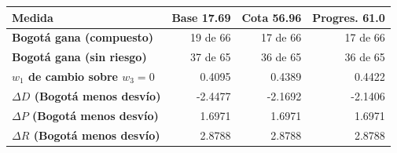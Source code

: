 \renewcommand{\arraystretch}{1.2}
\begin{tabular}{|l|r|r|r|}
\hline
\rowcolor{gray!20} \textbf{Medida} & \textbf{Base 17.69} & \textbf{Cota 56.96} & \textbf{Progres. 61.0} \\
\hline
\textbf{Bogotá gana (compuesto)} & 19 de 66 & 17 de 66 & 17 de 66 \\
\hline
\textbf{Bogotá gana (sin riesgo)} & 37 de 65 & 36 de 65 & 36 de 65 \\
\hline
\textbf{$w_1$ de cambio sobre $w_3=0$} & 0.4095 & 0.4389 & 0.4422 \\
\hline
\textbf{$\Delta D$ (Bogotá menos desvío)} & -2.4477 & -2.1692 & -2.1406 \\
\hline
\textbf{$\Delta P$ (Bogotá menos desvío)} & 1.6971 & 1.6971 & 1.6971 \\
\hline
\textbf{$\Delta R$ (Bogotá menos desvío)} & 2.8788 & 2.8788 & 2.8788 \\
\hline
\end{tabular}
